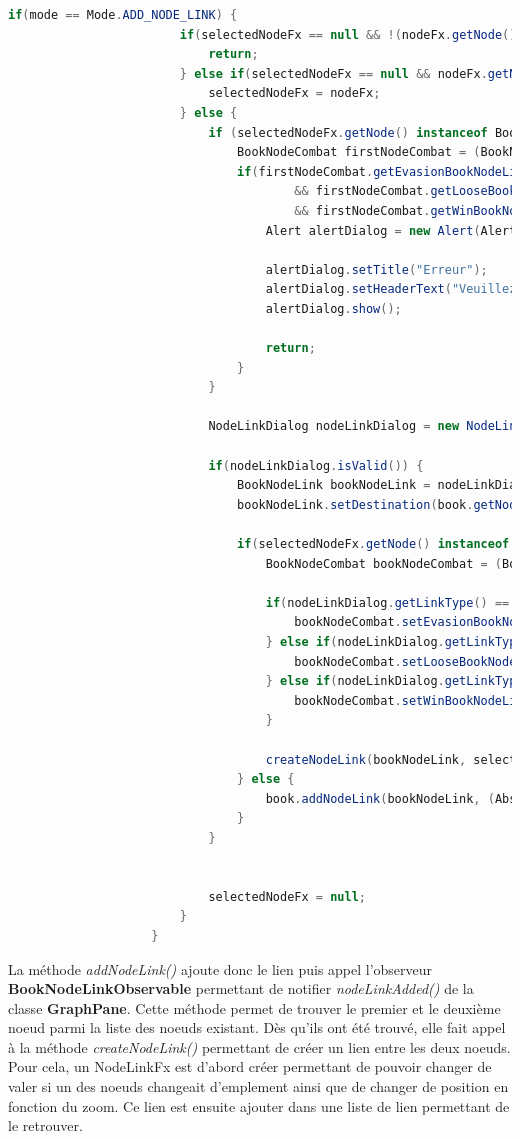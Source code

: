 				\begin{lstlisting}[gobble=12, language=java, caption=Classe NodeFxListener avec le mode ADD NODE LINK]
					if(mode == Mode.ADD_NODE_LINK) {
						if(selectedNodeFx == null && !(nodeFx.getNode() instanceof AbstractBookNodeWithChoices)) {
							return;
						} else if(selectedNodeFx == null && nodeFx.getNode() instanceof AbstractBookNodeWithChoices) {
							selectedNodeFx = nodeFx;
						} else {
							if (selectedNodeFx.getNode() instanceof BookNodeCombat){
								BookNodeCombat firstNodeCombat = (BookNodeCombat) selectedNodeFx.getNode();
								if(firstNodeCombat.getEvasionBookNodeLink() != null
										&& firstNodeCombat.getLooseBookNodeLink() != null
										&& firstNodeCombat.getWinBookNodeLink() != null) {
									Alert alertDialog = new Alert(Alert.AlertType.ERROR);

									alertDialog.setTitle("Erreur");
									alertDialog.setHeaderText("Veuillez supprimer un lien de victoire / defaite / evasion pour pouvoir rajouter un autre lien.");
									alertDialog.show();

									return;
								}
							}

							NodeLinkDialog nodeLinkDialog = new NodeLinkDialog(selectedNodeFx.getNode(), book);

							if(nodeLinkDialog.isValid()) {
								BookNodeLink bookNodeLink = nodeLinkDialog.getNodeLink();
								bookNodeLink.setDestination(book.getNodeIndex(nodeFx.getNode()));

								if(selectedNodeFx.getNode() instanceof BookNodeCombat) {
									BookNodeCombat bookNodeCombat = (BookNodeCombat) selectedNodeFx.getNode();

									if(nodeLinkDialog.getLinkType() == NodeLinkDialog.EVASION) {
										bookNodeCombat.setEvasionBookNodeLink(bookNodeLink);
									} else if(nodeLinkDialog.getLinkType() == NodeLinkDialog.PERDRE) {
										bookNodeCombat.setLooseBookNodeLink(bookNodeLink);
									} else if(nodeLinkDialog.getLinkType() == NodeLinkDialog.GAGNE) {
										bookNodeCombat.setWinBookNodeLink(bookNodeLink);
									}

									createNodeLink(bookNodeLink, selectedNodeFx, nodeFx);
								} else {
									book.addNodeLink(bookNodeLink, (AbstractBookNodeWithChoices) selectedNodeFx.getNode());
								}
							}


							selectedNodeFx = null;
						}
					}
				\end{lstlisting}

				La méthode \textit{addNodeLink()} ajoute donc le lien puis appel l'observeur \textbf{BookNodeLinkObservable} permettant de notifier \textit{nodeLinkAdded()} de la classe \textbf{GraphPane}. Cette méthode permet de trouver le premier et le deuxième noeud parmi la liste des noeuds existant. Dès qu'ils ont été trouvé, elle fait appel à la méthode \textit{createNodeLink()} permettant de créer un lien entre les deux noeuds.
				Pour cela, un NodeLinkFx est d'abord créer permettant de pouvoir changer de valer si un des noeuds changeait d'emplement ainsi que de changer de position en fonction du zoom. Ce lien est ensuite ajouter dans une liste de lien permettant de le retrouver.

